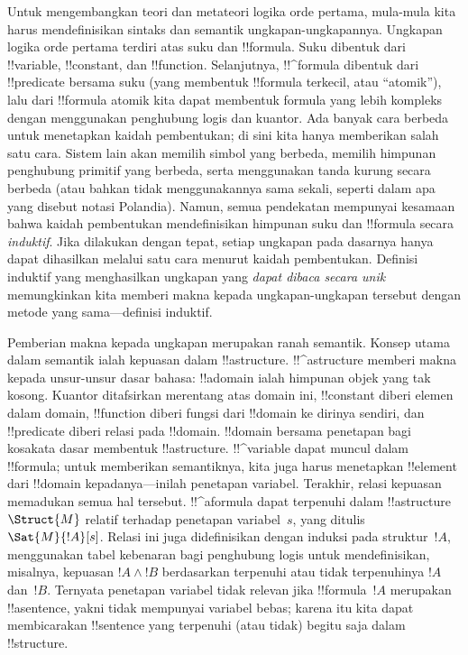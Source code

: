 \documentclass[../../../include/open-logic-section]{subfiles}
\begin{document}


Untuk mengembangkan teori dan metateori logika orde pertama, mula-mula kita
harus mendefinisikan sintaks dan semantik ungkapan-ungkapannya. Ungkapan logika
orde pertama terdiri atas suku dan !!{formula}. Suku dibentuk dari
!!{variable}, !!{constant}, dan !!{function}. Selanjutnya, !!^{formula}
dibentuk dari !!{predicate} bersama suku (yang membentuk !!{formula} terkecil,
atau ``atomik''), lalu dari !!{formula} atomik kita dapat membentuk formula
yang lebih kompleks dengan menggunakan penghubung logis dan kuantor. Ada
banyak cara berbeda untuk menetapkan kaidah pembentukan; di sini kita hanya
memberikan salah satu cara. Sistem lain akan memilih simbol yang berbeda,
memilih himpunan penghubung primitif yang berbeda, serta menggunakan tanda
kurung secara berbeda (atau bahkan tidak menggunakannya sama sekali, seperti
dalam apa yang disebut notasi Polandia). Namun, semua pendekatan mempunyai
kesamaan bahwa kaidah pembentukan mendefinisikan himpunan suku dan !!{formula}
secara \emph{induktif}. Jika dilakukan dengan tepat, setiap ungkapan pada
dasarnya hanya dapat dihasilkan melalui satu cara menurut kaidah pembentukan.
Definisi induktif yang menghasilkan ungkapan yang \emph{dapat dibaca secara
unik} memungkinkan kita memberi makna kepada ungkapan-ungkapan tersebut
dengan metode yang sama---definisi induktif.

Pemberian makna kepada ungkapan merupakan ranah semantik. Konsep utama dalam
semantik ialah kepuasan dalam !!a{structure}. !!^a{structure} memberi makna
kepada unsur-unsur dasar bahasa: !!a{domain} ialah himpunan objek yang tak
kosong. Kuantor ditafsirkan merentang atas domain ini, !!{constant} diberi
elemen dalam domain, !!{function} diberi fungsi dari !!{domain} ke dirinya
sendiri, dan !!{predicate} diberi relasi pada !!{domain}. !!{domain} bersama
penetapan bagi kosakata dasar membentuk !!a{structure}. !!^{variable} dapat
muncul dalam !!{formula}; untuk memberikan semantiknya, kita juga harus
menetapkan !!{element} dari !!{domain} kepadanya---inilah penetapan variabel.
Terakhir, relasi kepuasan memadukan semua hal tersebut. !!^a{formula} dapat
terpenuhi dalam !!a{structure}~$\Struct{M}$ relatif terhadap penetapan
variabel~$s$, yang ditulis $\Sat{M}{!A}[s]$. Relasi ini juga didefinisikan
dengan induksi pada struktur~$!A$, menggunakan tabel kebenaran bagi penghubung
logis untuk mendefinisikan, misalnya, kepuasan $!A \land !B$ berdasarkan
terpenuhi atau tidak terpenuhinya $!A$ dan~$!B$. Ternyata penetapan variabel
tidak relevan jika !!{formula}~$!A$ merupakan !!a{sentence}, yakni tidak
mempunyai variabel bebas; karena itu kita dapat membicarakan !!{sentence} yang
terpenuhi (atau tidak) begitu saja dalam !!{structure}.
\end{document}
